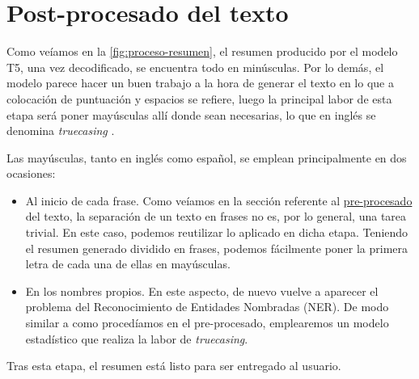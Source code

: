 \section{Post-procesado del texto} \label{sec:postprocesado}

Como veíamos en la \autoref{fig:proceso-resumen}, el resumen producido por el modelo T5, una vez decodificado, se encuentra todo en minúsculas. Por lo demás, el modelo parece hacer un buen trabajo a la hora de generar el texto en lo que a colocación de puntuación y espacios se refiere, luego la principal labor de esta etapa será poner mayúsculas allí donde sean necesarias, lo que en inglés se denomina \emph{truecasing} \cite{lita03}.

Las mayúsculas, tanto en inglés como español, se emplean principalmente en dos ocasiones:

\vspace*{-\baselineskip}
\begin{itemize}
	\item [\textbullet] Al inicio de cada frase. Como veíamos en la sección referente al \hyperref[sec:preprocesado]{pre-procesado} del texto, la separación de un texto en frases no es, por lo general, una tarea trivial. En este caso, podemos reutilizar lo aplicado en dicha etapa. Teniendo el resumen generado dividido en frases, podemos fácilmente poner la primera letra de cada una de ellas en mayúsculas.
	\item [\textbullet] En los nombres propios. En este aspecto, de nuevo vuelve a aparecer el problema del Reconocimiento de Entidades Nombradas (NER). De modo similar a como procedíamos en el pre-procesado, emplearemos un modelo estadístico que realiza la labor de \emph{truecasing}.
\end{itemize}

Tras esta etapa, el resumen está listo para ser entregado al usuario.